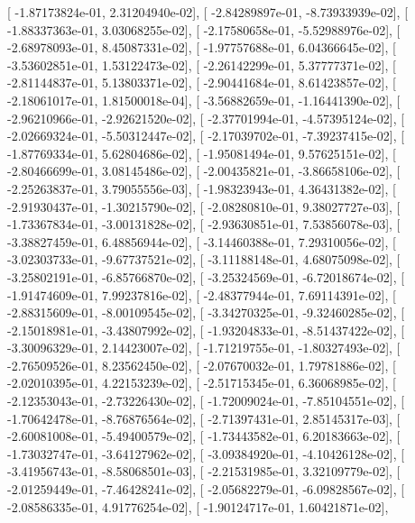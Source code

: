 \documentclass{article}
\begin{document}
       [ -1.87173824e-01,   2.31204940e-02],
       [ -2.84289897e-01,  -8.73933939e-02],
       [ -1.88337363e-01,   3.03068255e-02],
       [ -2.17580658e-01,  -5.52988976e-02],
       [ -2.68978093e-01,   8.45087331e-02],
       [ -1.97757688e-01,   6.04366645e-02],
       [ -3.53602851e-01,   1.53122473e-02],
       [ -2.26142299e-01,   5.37777371e-02],
       [ -2.81144837e-01,   5.13803371e-02],
       [ -2.90441684e-01,   8.61423857e-02],
       [ -2.18061017e-01,   1.81500018e-04],
       [ -3.56882659e-01,  -1.16441390e-02],
       [ -2.96210966e-01,  -2.92621520e-02],
       [ -2.37701994e-01,  -4.57395124e-02],
       [ -2.02669324e-01,  -5.50312447e-02],
       [ -2.17039702e-01,  -7.39237415e-02],
       [ -1.87769334e-01,   5.62804686e-02],
       [ -1.95081494e-01,   9.57625151e-02],
       [ -2.80466699e-01,   3.08145486e-02],
       [ -2.00435821e-01,  -3.86658106e-02],
       [ -2.25263837e-01,   3.79055556e-03],
       [ -1.98323943e-01,   4.36431382e-02],
       [ -2.91930437e-01,  -1.30215790e-02],
       [ -2.08280810e-01,   9.38027727e-03],
       [ -1.73367834e-01,  -3.00131828e-02],
       [ -2.93630851e-01,   7.53856078e-03],
       [ -3.38827459e-01,   6.48856944e-02],
       [ -3.14460388e-01,   7.29310056e-02],
       [ -3.02303733e-01,  -9.67737521e-02],
       [ -3.11188148e-01,   4.68075098e-02],
       [ -3.25802191e-01,  -6.85766870e-02],
       [ -3.25324569e-01,  -6.72018674e-02],
       [ -1.91474609e-01,   7.99237816e-02],
       [ -2.48377944e-01,   7.69114391e-02],
       [ -2.88315609e-01,  -8.00109545e-02],
       [ -3.34270325e-01,  -9.32460285e-02],
       [ -2.15018981e-01,  -3.43807992e-02],
       [ -1.93204833e-01,  -8.51437422e-02],
       [ -3.30096329e-01,   2.14423007e-02],
       [ -1.71219755e-01,  -1.80327493e-02],
       [ -2.76509526e-01,   8.23562450e-02],
       [ -2.07670032e-01,   1.79781886e-02],
       [ -2.02010395e-01,   4.22153239e-02],
       [ -2.51715345e-01,   6.36068985e-02],
       [ -2.12353043e-01,  -2.73226430e-02],
       [ -1.72009024e-01,  -7.85104551e-02],
       [ -1.70642478e-01,  -8.76876564e-02],
       [ -2.71397431e-01,   2.85145317e-03],
       [ -2.60081008e-01,  -5.49400579e-02],
       [ -1.73443582e-01,   6.20183663e-02],
       [ -1.73032747e-01,  -3.64127962e-02],
       [ -3.09384920e-01,  -4.10426128e-02],
       [ -3.41956743e-01,  -8.58068501e-03],
       [ -2.21531985e-01,   3.32109779e-02],
       [ -2.01259449e-01,  -7.46428241e-02],
       [ -2.05682279e-01,  -6.09828567e-02],
       [ -2.08586335e-01,   4.91776254e-02],
       [ -1.90124717e-01,   1.60421871e-02],
\end{document}
